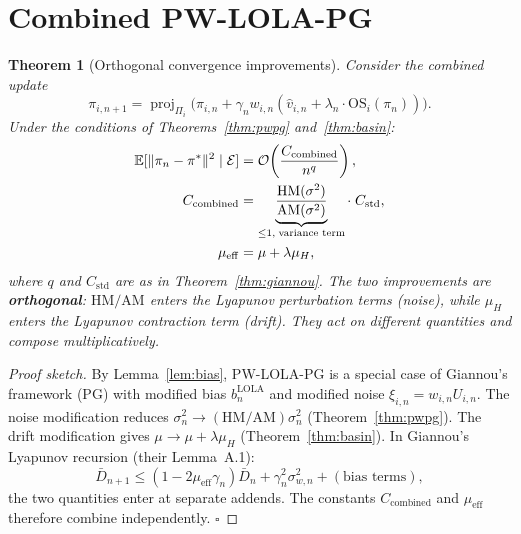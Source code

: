 \documentclass[10pt,letterpaper]{article}
\newtheorem{theorem}{Theorem}
\newcommand{\E}{\mathbb{E}}
\newcommand{\norm}[1]{\| #1 \|}
\newcommand{\HM}{\mathrm{HM}}
\newcommand{\AM}{\mathrm{AM}}
\newcommand{\proj}{\operatorname{proj}}
\begin{document}
\section{Combined PW-LOLA-PG}
\label{sec:combined}

\begin{theorem}[Orthogonal convergence improvements]
\label{thm:combined}
Consider the combined update
\begin{equation}
  \label{eq:pw-lola}
  \pi_{i,n+1} = \proj_{\Pi_i}\!\bigl(\pi_{i,n} + \gamma_n w_{i,n}
    (\hat{v}_{i,n} + \lambda_n \cdot \mathrm{OS}_i(\pi_n))\bigr).
\end{equation}
Under the conditions of Theorems~\ref{thm:pwpg} and~\ref{thm:basin}:
\begin{align}
  \E[\norm{\pi_n - \pi^*}^2 \mid \mathcal{E}]
  &= \mathcal{O}\!\left(\frac{C_{\mathrm{combined}}}{n^q}\right), \notag\\
  C_{\mathrm{combined}}
  &= \underbrace{\frac{\HM(\sigma^2)}{\AM(\sigma^2)}}_{\leq 1,\;\text{variance term}}
  \cdot\; C_{\mathrm{std}}, \label{eq:combined-constant}\\
  \mu_{\mathrm{eff}}
  &= \mu + \lambda\mu_H, \label{eq:combined-mu}
\end{align}
where $q$ and $C_{\mathrm{std}}$ are as in Theorem~\ref{thm:giannou}.
The two improvements are \textbf{orthogonal}: $\HM/\AM$ enters the
Lyapunov perturbation terms (noise), while $\mu_H$ enters the
Lyapunov contraction term (drift). They act on different quantities
and compose multiplicatively.
\end{theorem}

\begin{proof}[Proof sketch]
By Lemma~\ref{lem:bias}, PW-LOLA-PG is a special case of Giannou's
framework (PG) with modified bias $b_n^{\mathrm{LOLA}}$ and modified
noise $\xi_{i,n} = w_{i,n} U_{i,n}$. The noise modification reduces
$\sigma_n^2 \to (\HM/\AM)\sigma_n^2$ (Theorem~\ref{thm:pwpg}).
The drift modification gives $\mu \to \mu + \lambda\mu_H$
(Theorem~\ref{thm:basin}). In Giannou's Lyapunov recursion
(their Lemma~A.1):
\[
  \bar D_{n+1} \leq (1 - 2\mu_{\mathrm{eff}}\gamma_n)\bar D_n
  + \gamma_n^2 \sigma_{w,n}^2 + (\text{bias terms}),
\]
the two quantities enter at separate addends. The constants
$C_{\mathrm{combined}}$ and $\mu_{\mathrm{eff}}$ therefore combine
independently. $\square$
\end{proof}
\end{document}
